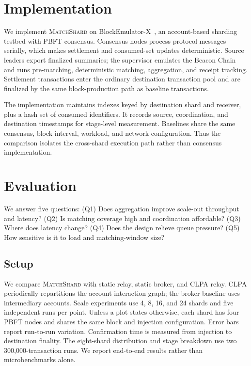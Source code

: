 \documentclass[sigconf,anonymous,review]{acmart}
\newcommand{\system}{\textsc{MatchShard}\xspace}
\begin{document}
\section{Implementation}

We implement \system on BlockEmulator-X~\cite{blockemulatorx2025}, an account-based sharding testbed with PBFT consensus. Consensus nodes process protocol messages serially, which makes settlement and consumed-set updates deterministic. Source leaders export finalized summaries; the supervisor emulates the Beacon Chain and runs pre-matching, deterministic matching, aggregation, and receipt tracking. Settlement transactions enter the ordinary destination transaction pool and are finalized by the same block-production path as baseline transactions.

The implementation maintains indexes keyed by destination shard and receiver, plus a hash set of consumed identifiers. It records source, coordination, and destination timestamps for stage-level measurement. Baselines share the same consensus, block interval, workload, and network configuration. Thus the comparison isolates the cross-shard execution path rather than consensus implementation.

\section{Evaluation}

We answer five questions: (Q1) Does aggregation improve scale-out throughput and latency? (Q2) Is matching coverage high and coordination affordable? (Q3) Where does latency change? (Q4) Does the design relieve queue pressure? (Q5) How sensitive is it to load and matching-window size?

\subsection{Setup}

We compare \system with static relay, static broker, and CLPA relay. CLPA periodically repartitions the account-interaction graph; the broker baseline uses intermediary accounts. Scale experiments use 4, 8, 16, and 24 shards and five independent runs per point. Unless a plot states otherwise, each shard has four PBFT nodes and shares the same block and injection configuration. Error bars report run-to-run variation. Confirmation time is measured from injection to destination finality. The eight-shard distribution and stage breakdown use two 300,000-transaction runs. We report end-to-end results rather than microbenchmarks alone.
\end{document}
